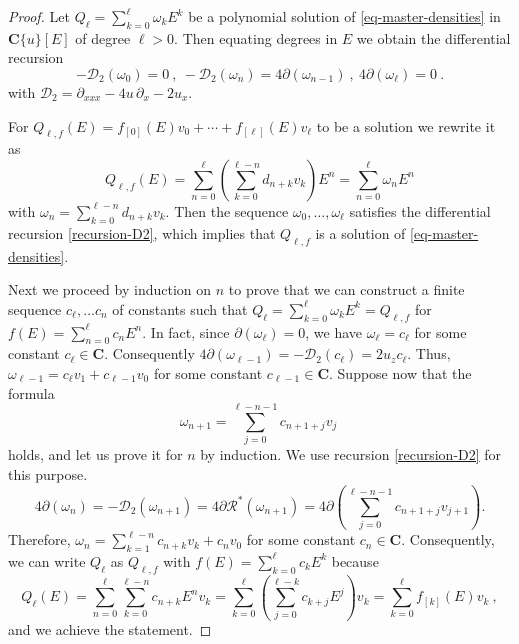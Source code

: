 \documentclass[a4paper,12pt]{article}
\newcommand{\cD}{\mathcal{D}}
\newcommand{\cR}{\mathcal{R}}
\newcommand{\coC}{\mathbf{C}}
\newcommand{\dx}{\partial_x}
\newcommand{\dxxx}{\partial_{xxx}}
\begin{document}
\begin{proof}
    Let $Q_\ell =\sum_{k=0} ^\ell \omega_k E^k$ be a polynomial solution of \eqref{eq-master-densities} in $\coC\{u\}[E]$ of degree $\ell >0$. Then equating degrees in $E$ we obtain the differential recursion
    \begin{equation}\label{recursion-D2}
        -\cD_2 (\omega_0 )=0 \ , \ -\cD_2 (\omega_n )=4 \partial (\omega_{n-1}) \ , \ 4 \partial (\omega_\ell )=0 \ .
    \end{equation}
    with $ \cD_2 = \dxxx - 4u\,\dx - 2u_x $. 

For $ Q_{\ell , f } (E) = f_{[0]}(E) v_0 +\cdots + f_{[\ell]}(E) v_\ell$ to be a solution we rewrite it as
\[
 Q_{\ell , f } (E) = \sum_{n=0}^{\ell} \left( \sum_{k=0}^{\ell -n} d_{n+k}  v_k \right) E^n  = \sum_{n=0}^{\ell}  \omega_n  E^n 
\]
with $\omega_n = \sum_{k=0}^{\ell -n} d_{n+k}  v_k$. Then the sequence $\omega_0 , \dots , \omega_\ell$ satisfies the differential recursion \eqref{recursion-D2}, which implies that $ Q_{\ell , f } $ is a solution of \eqref{eq-master-densities}.

Next we proceed by induction on $n$ to prove that we can construct a finite sequence $c_\ell , \dots c_n$ of constants such that $Q_\ell =\sum_{k=0} ^\ell \omega_k E^k=   Q_{\ell , f }$ for $f(E)=\sum_{n=0}^\ell c_n E^n$. In fact, since $\partial (\omega_\ell )=0$, we have $\omega_\ell =c_\ell$ for some constant $c_\ell \in \coC$. Consequently $4 \partial (\omega_{\ell -1}) = -\cD_2 (c _\ell  )=2u_z c_\ell$. Thus, $\omega_{\ell -1}= c_\ell v_1 +c_{\ell -1} v_0 $ for some constant $c_{\ell -1} \in \coC $. Suppose now that the formula
    \[
    \omega_{n+1} = \sum_{j=0}^{\ell-n-1}c_{n+1+j} v_j \ 
    \]
    holds, and let us prove it for $n$ by induction. We use recursion \eqref{recursion-D2} for this purpose.
    \[
    4 \partial (\omega_{n})= -\cD_2 (\omega_{n+1} )=4\partial \cR^* (\omega_{n+1})=4\partial 
    \left(
    \sum_{j=0}^{\ell-n-1} c_{n+1+j} v_{j+1}
    \right) .
    \]
 Therefore, $\omega_{n} = \sum_{k=1}^{\ell-n} c_{n+k} v_k + c_n v_0 $ for some constant $c_n \in \coC$. Consequently, we can write $Q_\ell $ as $Q_{\ell , f}$ with $f(E) = \sum_{k=0}^\ell c_k E^k$ because
   \[
   Q_{\ell } (E) = \sum_{n=0}^{\ell} \sum_{k=0}^{\ell -n} c_{n+k}  E^n  v_k= \sum_{k=0}^{\ell} 
   \left(
   \sum_{j=0}^{\ell -k} c_{k+j}E^j 
   \right)
   v_k = \sum_{k=0}^{\ell} f_{[k]} (E) 
     v_k \ ,
   \]
  and we achieve the statement.
\end{proof}
\end{document}
